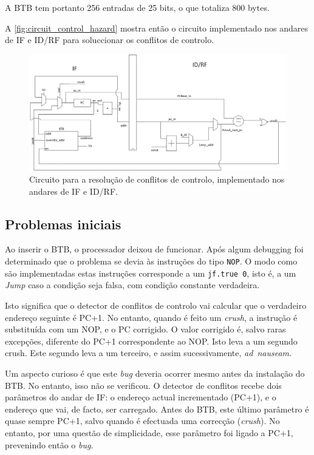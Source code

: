 \documentclass[a4paper]{article}
\begin{document}
	A BTB tem portanto 256 entradas de 25 bits, o que totaliza 800 bytes.
	
	A \autoref{fig:circuit_control_hazard} mostra então o circuito implementado nos andares de IF e ID/RF para soluccionar os conflitos de controlo.
	
	\begin{figure}[h]
			\centering
			\includegraphics[width=1.\textwidth]{img/circuit_control_hazard}
			\caption{Circuito para a resolução de conflitos de controlo, implementado nos andares de IF e ID/RF.}
			\label{fig:circuit_control_hazard}
		\end{figure}
	
	\subsection{Problemas iniciais}
	
	Ao inserir o BTB, o processador deixou de funcionar. Após algum debugging foi determinado que o problema se devia às instruções do tipo \texttt{NOP}. O modo como são implementadas estas instruções corresponde a um \texttt{jf.true 0}, isto é, a um \textit{Jump} caso a condição seja falsa, com condição constante verdadeira.
	
	Isto significa que o detector de conflitos de controlo vai calcular que o verdadeiro endereço seguinte é PC+1. No entanto, quando é feito um \textit{crush}, a instrução é substituída com um NOP, e o PC corrigido. O valor corrigido é, salvo raras excepções, diferente do PC+1 correspondente ao NOP. Isto leva a um segundo crush. Este segundo leva a um terceiro, e assim sucessivamente, \textit{ad~nauseam}.
	
	Um aspecto curioso é que este \textit{bug} deveria ocorrer mesmo antes da instalação do BTB. No entanto, isso não se verificou. O detector de conflitos recebe dois parâmetros do andar de IF: o endereço actual incrementado (PC+1), e o endereço que vai, de facto, ser carregado. Antes do BTB, este último parâmetro é quase sempre PC+1, salvo quando é efectuada uma correcção (\textit{crush}). No entanto, por uma questão de simplicidade, esse parâmetro foi ligado a PC+1, prevenindo então o \textit{bug}.
	
\end{document}
